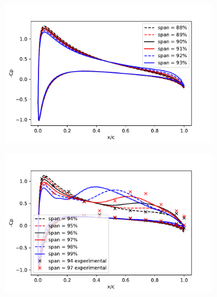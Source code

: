 \documentclass{beamer}
\begin{document}
\begin{frame}
\begin{figure}[!tbp]
\begin{subfigure}[b]{0.4\linewidth}
		\end{subfigure}
	\hfill
		\begin{subfigure}[b]{0.4\linewidth}
			\includegraphics[width=\linewidth]{pressure_dist3.pdf}
		\end{subfigure}
	\hfill
		\begin{subfigure}[b]{0.4\linewidth}
			\includegraphics[width=\linewidth]{pressure_dist4.pdf}
		\end{subfigure}
	\hfill
	\end{figure}
\end{frame}
\end{document}
